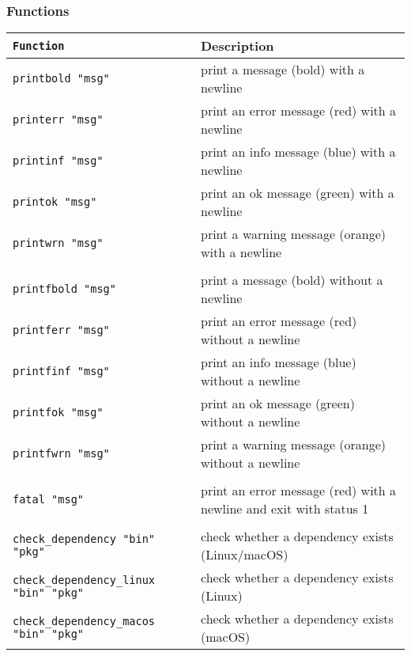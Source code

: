 \documentclass[documentation]{subfiles}
\begin{document}
\subsubsection{Functions}
\begin{longtable}{>{\tt}ll}
    \toprule
    {\bf Function}                              & {\bf Description}\\
    \midrule\endhead%
    printbold "msg"                             & print a message (bold) with a newline\\
    printerr  "msg"                             & print an error message (red) with a newline\\
    printinf  "msg"                             & print an info message (blue) with a newline\\
    printok   "msg"                             & print an ok message (green) with a newline\\
    printwrn  "msg"                             & print a warning message (orange) with a newline\\
                                                & \\
    printfbold "msg"                            & print a message (bold) without a newline\\
    printferr  "msg"                            & print an error message (red) without a newline\\
    printfinf  "msg"                            & print an info message (blue) without a newline\\
    printfok   "msg"                            & print an ok message (green) without a newline\\
    printfwrn  "msg"                            & print a warning message (orange) without a newline\\
                                                & \\
    fatal     "msg"                             & print an error message (red) with a newline and exit with status 1\\
                                                & \\
    check\_dependency        "bin" "pkg"        & check whether a dependency exists (Linux/macOS)\\
    check\_dependency\_linux "bin" "pkg"        & check whether a dependency exists (Linux)\\
    check\_dependency\_macos "bin" "pkg"        & check whether a dependency exists (macOS)\\

\end{longtable}
\end{document}
